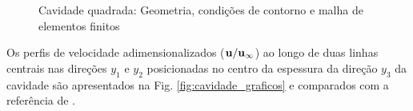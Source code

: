 \documentclass[tese_patricia]{subfiles}%
\begin{document}
\begin{figure}[!htb]
	\centering
	 \quad
	\caption{Cavidade quadrada: Geometria, condições de contorno e malha de elementos finitos}
\end{figure}

Os perfis de velocidade adimensionalizados ($\mathbf{u}/\mathbf{u}_{\infty}$) ao longo de duas linhas centrais nas direções $y_1$ e $y_2$ posicionadas no centro da espessura da direção $y_3$ da cavidade são apresentados na Fig. \ref{fig:cavidade_graficos} e comparados com a referência de .
\end{document}
